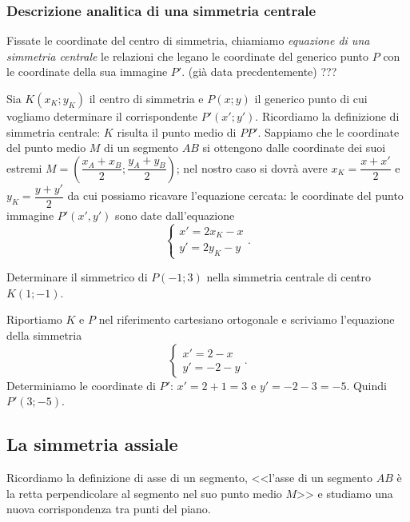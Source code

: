 \subsubsection{Descrizione analitica di una simmetria centrale}

\begin{definizione}
Fissate le coordinate del centro di simmetria, chiamiamo \emph{equazione di una simmetria centrale} le relazioni che legano le coordinate del generico punto $P$ con le coordinate della sua immagine $P'$. (già data precdentemente) ???
\end{definizione}

Sia $K(x_K;y_K)$ il centro di simmetria e $P(x;y)$ il generico punto di cui vogliamo determinare il corrispondente $P'(x';y')$. Ricordiamo la definizione di simmetria centrale: $K$ risulta il punto medio di $PP'$. Sappiamo che le coordinate del punto medio $M$ di un segmento $AB$ si ottengono dalle coordinate dei suoi estremi $M=\left(\dfrac{x_A+x_B}{2};\dfrac{y_A+y_B}{2}\right)$; nel nostro caso si dovrà avere $x_K=\dfrac{x+x'}{2}$ e $y_K=\dfrac{y+y'}{2}$ da cui possiamo ricavare l'equazione cercata: le coordinate del punto immagine $P'(x',y')$ sono date dall'equazione
\[\begin{cases}x'=2x_K-x\\y'=2y_K-y\end{cases}.\]

\begin{exrig}
\begin{esempio}
Determinare il simmetrico di $P(-1;3)$ nella simmetria centrale di centro $K(1;-1)$.\vspace{7pt}

Riportiamo $K$ e $P$ nel riferimento cartesiano ortogonale e scriviamo l'equazione della simmetria
\[\begin{cases}x'=2-x\\y'=-2-y\end{cases}.\]
Determiniamo le coordinate di $P'$: $x'=2+1=3$ e $y'=-2-3=-5$. Quindi $P'(3;-5)$.
\end{esempio}
\end{exrig}

\subsection{La simmetria assiale}

Ricordiamo la definizione di asse di un segmento, <<l'asse di un segmento $AB$ è la retta perpendicolare al segmento nel suo punto medio $M$>> e studiamo una nuova corrispondenza tra punti del piano.

